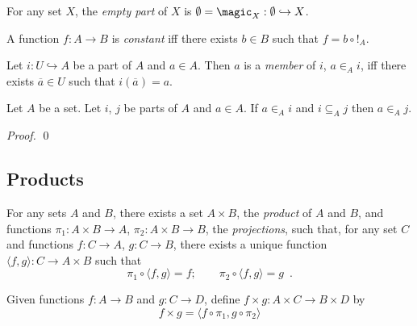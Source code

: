 \begin{df}
  For any set $X$, the \emph{empty part} of $X$ is $\emptyset = \magic_X : \emptyset \hookrightarrow X$.
\end{df}

  \begin{df}
  A function $f : A \rightarrow B$ is \emph{constant} iff there exists $b \in
  B$ such that $f = b \circ !_A$.
\end{df}

\begin{df}[Membership]
 Let $i : U \hookrightarrow A$ be a part of $A$ and $a \in A$. Then $a$ is a
 \emph{member} of $i$, $a \in_A i$, iff there exists $\overline{a} \in U$ such that $i(\overline{a}) = a$.
\end{df}

\begin{prop}
 Let $A$ be a set. Let $i$, $j$ be parts of $A$ and $a \in A$. If $a \in_A i$
 and $i \subseteq_A j$ then $a \in_A j$.
\end{prop}

\begin{proof}
 \pf
 \qed
\end{proof}

\subsection{Products}

\begin{ax}[Products]
  For any sets $A$ and $B$, there exists a set $A \times B$, the
  \emph{product} of $A$ and $B$, and functions $\pi_1 : A \times B
  \rightarrow A$, $\pi_2 : A \times B \rightarrow B$, the \emph{projections},
  such that, for any set $C$ and functions $f : C \rightarrow A$, $g : C
  \rightarrow B$, there exists a unique function $\langle f, g \rangle : C
  \rightarrow A \times B$ such that
  \[ \pi_1 \circ \langle f, g \rangle = f; \qquad \pi_2 \circ \langle f,g
  \rangle
  = g \enspace . \]
\end{ax}

\begin{df}
  Given functions $f : A \rightarrow B$ and $g : C \rightarrow D$, define $f
  \times g : A \times C \rightarrow B \times D$ by
  \[ f \times g = \langle f \circ \pi_1, g \circ \pi_2 \rangle \]
\end{df}

